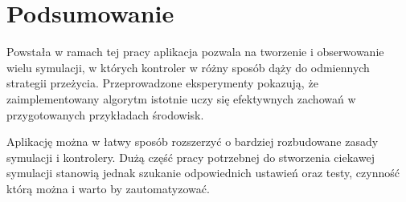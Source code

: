 \chapter{Podsumowanie}
Powstała w ramach tej pracy aplikacja pozwala na tworzenie i obserwowanie wielu symulacji, w których kontroler w różny sposób dąży do odmiennych strategii przeżycia. Przeprowadzone eksperymenty pokazują, że zaimplementowany algorytm istotnie uczy się efektywnych zachowań w przygotowanych przykładach środowisk.

Aplikację można w łatwy sposób rozszerzyć o bardziej rozbudowane zasady symulacji i kontrolery. Dużą część pracy potrzebnej do stworzenia ciekawej symulacji stanowią jednak szukanie odpowiednich ustawień oraz testy, czynność którą można i warto by zautomatyzować.
